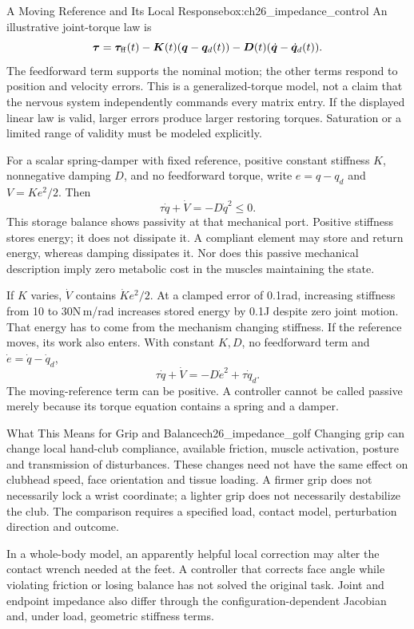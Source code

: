 \begin{principle}{A Moving Reference and Its Local Response}{box:ch26_impedance_control}
An illustrative joint-torque law is
\[
\bm\tau=\bm\tau_{\rm ff}(t)
-\bm K(t)(\bm q-\bm q_d(t))
-\bm D(t)(\dot{\bm q}-\dot{\bm q}_d(t)).
\]
The feedforward term supports the nominal motion; the other terms respond to position and velocity errors. This is a generalized-torque model, not a claim that the nervous system independently commands every matrix entry. If the displayed linear law is valid, larger errors produce larger restoring torques. Saturation or a limited range of validity must be modeled explicitly.
\end{principle}

For a scalar spring-damper with fixed reference, positive constant stiffness $K$, nonnegative damping $D$, and no feedforward torque, write $e=q-q_d$ and $V=Ke^2/2$. Then
\[
\tau\dot q+\dot V=-D\dot q^2\leq0.
\]
This storage balance shows passivity at that mechanical port. Positive stiffness stores energy; it does not dissipate it. A compliant element may store and return energy, whereas damping dissipates it. Nor does this passive mechanical description imply zero metabolic cost in the muscles maintaining the state.

If $K$ varies, $\dot V$ contains $\dot K e^2/2$. At a clamped error of 0.1rad, increasing stiffness from 10 to 30N\,m/rad increases stored energy by 0.1J despite zero joint motion. That energy has to come from the mechanism changing stiffness. If the reference moves, its work also enters. With constant $K,D$, no feedforward term and $\dot e=\dot q-\dot q_d$,
\[
\tau\dot q+\dot V=-D\dot e^2+\tau\dot q_d.
\]
The moving-reference term can be positive. A controller cannot be called passive merely because its torque equation contains a spring and a damper.

\begin{example}{What This Means for Grip and Balance}{ch26_impedance_golf}
Changing grip can change local hand-club compliance, available friction, muscle activation, posture and transmission of disturbances. These changes need not have the same effect on clubhead speed, face orientation and tissue loading. A firmer grip does not necessarily lock a wrist coordinate; a lighter grip does not necessarily destabilize the club. The comparison requires a specified load, contact model, perturbation direction and outcome.

In a whole-body model, an apparently helpful local correction may alter the contact wrench needed at the feet. A controller that corrects face angle while violating friction or losing balance has not solved the original task. Joint and endpoint impedance also differ through the configuration-dependent Jacobian and, under load, geometric stiffness terms.
\end{example}

